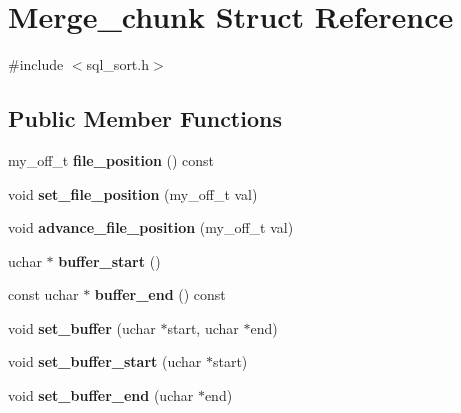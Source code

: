 \hypertarget{structMerge__chunk}{}\section{Merge\+\_\+chunk Struct Reference}
\label{structMerge__chunk}


{\ttfamily \#include $<$sql\+\_\+sort.\+h$>$}

\subsection*{Public Member Functions}
\begin{DoxyCompactItemize}
\item 
\mbox{\label{structMerge__chunk_ab3b78543f9cd490e13f6591f4ecce03c}} 
my\+\_\+off\+\_\+t {\bfseries file\+\_\+position} () const
\item 
\mbox{\label{structMerge__chunk_a42168b1a973a805c199ce341e2af0343}} 
void {\bfseries set\+\_\+file\+\_\+position} (my\+\_\+off\+\_\+t val)
\item 
\mbox{\label{structMerge__chunk_a5a3b9cdab8c019f11c95c06212ef7679}} 
void {\bfseries advance\+\_\+file\+\_\+position} (my\+\_\+off\+\_\+t val)
\item 
\mbox{\label{structMerge__chunk_a32a2f39e291f575cd66e8926dafcf680}} 
uchar $\ast$ {\bfseries buffer\+\_\+start} ()
\item 
\mbox{\label{structMerge__chunk_a802290c8cb1754a3ff2a769ff12f98e1}} 
const uchar $\ast$ {\bfseries buffer\+\_\+end} () const
\item 
\mbox{\label{structMerge__chunk_aacf9c3df264b8fd6aa546a8dffc65ea6}} 
void {\bfseries set\+\_\+buffer} (uchar $\ast$start, uchar $\ast$end)
\item 
\mbox{\label{structMerge__chunk_a36bcf877a52d2036442da8e6fbf56b88}} 
void {\bfseries set\+\_\+buffer\+\_\+start} (uchar $\ast$start)
\item 
\mbox{\label{structMerge__chunk_ac670abec814dfcc4bb708585d6ffb9af}} 
void {\bfseries set\+\_\+buffer\+\_\+end} (uchar $\ast$end)

\end{DoxyCompactItemize}
